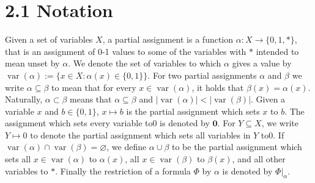 \section*{2.1 Notation}
Given a set of variables $X$, a partial assignment is a function $\alpha:X\to\{0,1,*\}$, that is an assignment of 0-1 values to some of the variables with $*$ intended to mean unset by $\alpha$. We denote the set of variables to which $\alpha$ gives a value by $\operatorname{var}(\alpha):=\{x\in X:\alpha(x)\in\{0,1\}\}$. For two partial assignments $\alpha$ and $\beta$ we write $\alpha\subseteq\beta$ to mean that for every $x\in\operatorname{var}(\alpha)$, it holds that $\beta(x)=\alpha(x)$. Naturally, $\alpha\subset\beta$ means that $\alpha\subseteq\beta$ and $|\operatorname{var}(\alpha)|<|\operatorname{var}(\beta)|$. Given a variable $x$ and $b\in\{0,1\}$, $x\mapsto b$ is the partial assignment which sets $x$ to $b$. The assignment which sets every variable to0 is denoted by $\mathbf0$. For $Y\subseteq X$, we write $Y\mapsto0$ to denote the partial assignment which sets all variables in $Y$ to0. If $\operatorname{var}(\alpha)\cap\operatorname{var}(\beta)=\varnothing$, we define $\alpha\cup\beta$ to be the partial assignment which sets all $x\in\operatorname{var}(\alpha)$ to $\alpha(x)$, all $x\in\operatorname{var}(\beta)$ to $\beta(x)$, and all other variables to $*$. Finally the restriction of a formula $\Phi$ by $\alpha$ is denoted by $\Phi|_\alpha$.
